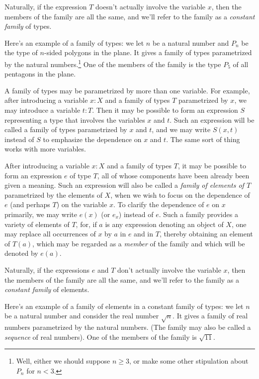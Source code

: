 Naturally, if the expression $T$ doesn't actually involve the variable $x$, then the members of the family are all the same,
and we'll refer to the family as a \emph{constant family} of types.

Here's an example of a family of types: we let $n$ be a natural number and $P_n$ be the type of $n$-sided polygons in the plane.  It gives a family
of types parametrized by the natural numbers.\footnote{\color{casred} Well, either we should suppose $n\ge3$, or make some other stipulation about $P_n$ for $n<3$.}
One of the members of the family is the type $P_5$ of all pentagons in the plane.

A family of types may be parametrized by more than one variable.  For example, after introducing a variable $x:X$ and a family of types $T$
parametrized by $x$, we may introduce a variable $t:T$.  Then it may be possible to form an expression $S$ representing a type that involves the
variables $x$ and $t$.  Such an expression will be called a family of types parametrized by $x$ and $t$, and we may write $S(x,t)$ instead of
$S$ to emphasize the dependence on $x$ and $t$.  The same sort of thing works with more variables. 

After introducing a variable $x:X$ and a family of types $T$, it may be possible to form an expression $e$ of type $T$, all of whose components have been already been
given a meaning.
Such an expression will also be called a \emph{family of elements of $T$}  parametrized by the elements of $X$, when
we wish to focus on the dependence of $e$ (and perhaps $T$) on the variable $x$.
To clarify the dependence of $e$ on $x$ primarily, we may write $e(x)$ (or $e_x$) instead of $e$.
Such a family provides a variety of elements of $T$, for, if $a$ is any expression denoting an object of $X$, one may replace all
occurrences of $x$ by $a$ in $e$ and in $T$, thereby obtaining an element of $T(a)$, which may be regarded as a \emph{member} of the family
and which will be denoted by $e(a)$.

Naturally, if the expressions $e$ and $T$ don't actually involve the variable $x$, then the members of the family are all the same,
and we'll refer to the family as a \emph{constant family} of elements.

Here's an example of a family of elements in a constant family of types: we let $n$ be a natural number and consider the real number $\sqrt n$.
It gives a family of real numbers parametrized by the natural numbers.
(The family may also be called a \emph{sequence} of real numbers).
One of the members of the family is $\sqrt{11}$.

